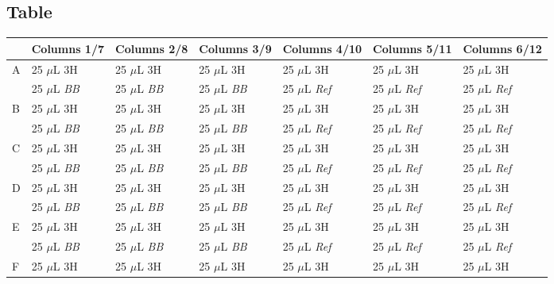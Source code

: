 \documentclass[12pt, letterpaper]{article}
\begin{document}
\subsection{Table}
\begin{table}[h]
    \begin{center}
        \begin{tabular}{|l|lll|lll|}
        \hline
        & Columns 1/7         & Columns 2/8         & Columns 3/9         & Columns 4/10         & Columns 5/11         & Columns 6/12         \\ \hline
        A & 25 $\mu$L 3H        & 25 $\mu$L 3H        & 25 $\mu$L 3H        & 25 $\mu$L 3H         & 25 $\mu$L 3H         & 25 $\mu$L 3H         \\
        & 25 $\mu$L \emph{BB} & 25 $\mu$L \emph{BB} & 25 $\mu$L \emph{BB} & 25 $\mu$L \emph{Ref} & 25 $\mu$L \emph{Ref} & 25 $\mu$L \emph{Ref} \\ \hline
        B & 25 $\mu$L 3H        & 25 $\mu$L 3H        & 25 $\mu$L 3H        & 25 $\mu$L 3H         & 25 $\mu$L 3H         & 25 $\mu$L 3H         \\
        & 25 $\mu$L \emph{BB} & 25 $\mu$L \emph{BB} & 25 $\mu$L \emph{BB} & 25 $\mu$L \emph{Ref} & 25 $\mu$L \emph{Ref} & 25 $\mu$L \emph{Ref} \\ \hline
        C & 25 $\mu$L 3H        & 25 $\mu$L 3H        & 25 $\mu$L 3H        & 25 $\mu$L 3H         & 25 $\mu$L 3H         & 25 $\mu$L 3H         \\
        & 25 $\mu$L \emph{BB} & 25 $\mu$L \emph{BB} & 25 $\mu$L \emph{BB} & 25 $\mu$L \emph{Ref} & 25 $\mu$L \emph{Ref} & 25 $\mu$L \emph{Ref} \\ \hline
        D & 25 $\mu$L 3H        & 25 $\mu$L 3H        & 25 $\mu$L 3H        & 25 $\mu$L 3H         & 25 $\mu$L 3H         & 25 $\mu$L 3H         \\
        & 25 $\mu$L \emph{BB} & 25 $\mu$L \emph{BB} & 25 $\mu$L \emph{BB} & 25 $\mu$L \emph{Ref} & 25 $\mu$L \emph{Ref} & 25 $\mu$L \emph{Ref} \\ \hline
        E & 25 $\mu$L 3H        & 25 $\mu$L 3H        & 25 $\mu$L 3H        & 25 $\mu$L 3H         & 25 $\mu$L 3H         & 25 $\mu$L 3H         \\
        & 25 $\mu$L \emph{BB} & 25 $\mu$L \emph{BB} & 25 $\mu$L \emph{BB} & 25 $\mu$L \emph{Ref} & 25 $\mu$L \emph{Ref} & 25 $\mu$L \emph{Ref} \\ \hline
        F & 25 $\mu$L 3H        & 25 $\mu$L 3H        & 25 $\mu$L 3H        & 25 $\mu$L 3H         & 25 $\mu$L 3H         & 25 $\mu$L 3H         \\

\end{tabular}
\end{center}
\end{table}
\end{document}
